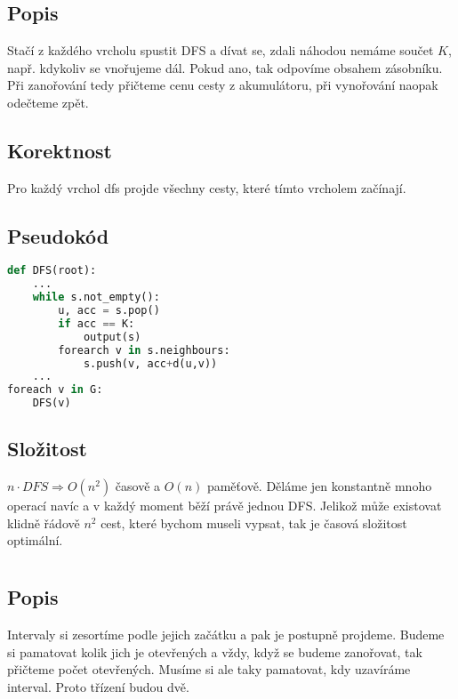 \documentclass[a4paper]{article}
\begin{document}
\text{}\vspace{-0.1cm}
{\fontsize{12}{15}\selectfont \hspace{-0.5cm}}

\section{}
\subsection{Popis}
Stačí z každého vrcholu spustit DFS a dívat se, zdali náhodou nemáme součet $K$, např. kdykoliv se vnořujeme dál. Pokud ano, tak odpovíme obsahem zásobníku. Při zanořování tedy přičteme cenu cesty z akumulátoru, při vynořování naopak odečteme zpět.
\subsection{Korektnost}
Pro každý vrchol dfs projde všechny cesty, které tímto vrcholem začínají.

\subsection{Pseudokód}
\begin{lstlisting}[language=Python]
def DFS(root):
	...
	while s.not_empty():
		u, acc = s.pop()
		if acc == K:
			output(s)
		forearch v in s.neighbours:
			s.push(v, acc+d(u,v))
	...
foreach v in G:
	DFS(v)
\end{lstlisting}

\subsection{Složitost}
$n\cdot DFS \Rightarrow O(n^2)$ časově a $O(n)$ paměťově. Děláme jen konstantně mnoho operací navíc a v každý moment běží právě jednou DFS. Jelikož může existovat klidně řádově $n^2$ cest, které bychom museli vypsat, tak je časová složitost optimální.


\section{}
\subsection{Popis}
Intervaly si zesortíme podle jejich začátku a pak je postupně projdeme. Budeme si pamatovat kolik jich je otevřených a vždy, když se budeme zanořovat, tak přičteme počet otevřených. Musíme si ale taky pamatovat, kdy uzavíráme interval. Proto třízení budou dvě.
\end{document}
